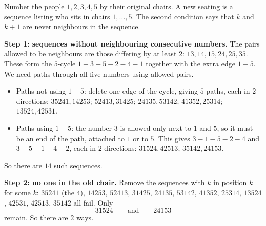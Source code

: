 Number the people $1,2,3,4,5$ by their original chairs. A new seating is a sequence listing who sits in chairs $1,\dots,5$. The second condition says that $k$ and $k+1$ are never neighbours in the sequence.

\textbf{Step 1: sequences without neighbouring consecutive numbers.} The pairs allowed to be neighbours are those differing by at least $2$: $13,14,15,24,25,35$. These form the $5$-cycle $1-3-5-2-4-1$ together with the extra edge $1-5$. We need paths through all five numbers using allowed pairs.
\begin{itemize}
\item Paths not using $1-5$: delete one edge of the cycle, giving $5$ paths, each in $2$ directions: $35241,14253$; $52413,31425$; $24135,53142$; $41352,25314$; $13524,42531$.
\item Paths using $1-5$: the number $3$ is allowed only next to $1$ and $5$, so it must be an end of the path, attached to $1$ or to $5$. This gives $3-1-5-2-4$ and $3-5-1-4-2$, each in $2$ directions: $31524,42513$; $35142,24153$.
\end{itemize}
So there are $14$ such sequences.

\textbf{Step 2: no one in the old chair.} Remove the sequences with $k$ in position $k$ for some $k$: $35241$ (the $4$), $14253$, $52413$, $31425$, $24135$, $53142$, $41352$, $25314$, $13524$, $42531$, $42513$, $35142$ all fail. Only
\[31524\qquad\text{and}\qquad24153\]
remain. So there are $\boxed{2}$ ways.
